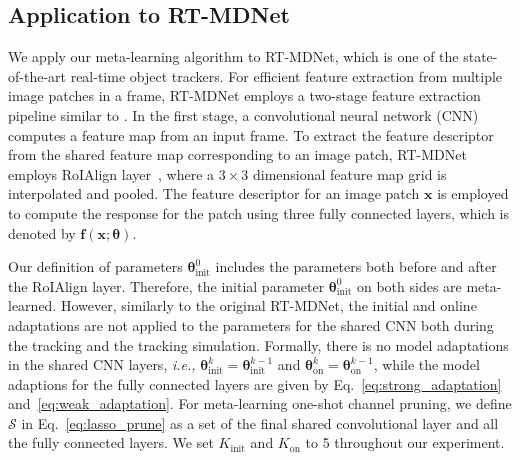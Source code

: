 \documentclass[letterpaper]{article} %
\def \x{\mathbf{x}}
\def \f{\mathbf{f}}
\def \thetainit{{\boldsymbol{\theta}_\text{init}^0}}
\def \thetainitadapt{\boldsymbol{\theta}_\text{init}}
\def \thetaonlineadapt{\boldsymbol{\theta}_\text{on}}
\def \Kinit{K_\text{init}}
\def \Konline{K_\text{on}}
\begin{document}
\subsection{Application to RT-MDNet}

We apply our meta-learning algorithm to RT-MDNet, which is one of the state-of-the-art real-time object trackers.
For efficient feature extraction from multiple image patches in a frame, RT-MDNet employs a two-stage feature extraction pipeline similar to \cite{he2017maskrcnn}.
In the first stage, a convolutional neural network (CNN) computes a feature map from an input frame.
To extract the feature descriptor from the shared feature map corresponding to an image patch, RT-MDNet employs RoIAlign layer~\cite{he2017maskrcnn}, where a $3 \times 3$ dimensional feature map grid is interpolated and pooled.
The feature descriptor for an image patch $\x$ is employed to compute the response for the patch using three fully connected layers, which is denoted by $\f(\x; \boldsymbol{\theta})$.

Our definition of parameters $\thetainit$ includes the parameters both before and after the RoIAlign layer.
Therefore, the initial parameter $\thetainit$ on both sides are meta-learned.
However, similarly to the original RT-MDNet, the initial and online adaptations are not applied to the parameters for the shared CNN both during the tracking and the tracking simulation.
Formally, there is no model adaptations in the shared CNN layers, {\it i.e.,} $\thetainitadapt^k=\thetainitadapt^{k-1}$ and $\thetaonlineadapt^k=\thetaonlineadapt^{k-1}$, while the model adaptions for the fully connected layers are given by Eq.~\eqref{eq:strong_adaptation} and~\eqref{eq:weak_adaptation}.
For meta-learning one-shot channel pruning, we define $\mathcal{S}$ in Eq.~\eqref{eq:lasso_prune} as a set of the final shared convolutional layer and all the fully connected layers.
We set $\Kinit$ and $\Konline$ to 5 throughout our experiment.
\end{document}
